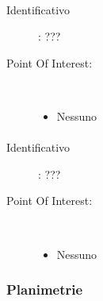 \documentclass[../SperimentazioniPratiche.tex]{subfiles}
\begin{document}
			\paragraph*{}
			\label{01006}
			\begin{tcolorbox}[fonttitle=\bfseries, 
								adjusted title={\Large Beacon 01006},
								sharp corners=south,
								colback=white, 
								colframe=white!50!blue!75!black]
								
				\begin{description}
					\item[Identificativo]: ???

					\tcbline					
					
					\item[Point Of Interest:] \ \par
					\begin{itemize}
						\item Nessuno
					\end{itemize}					   				
				\end{description}  				
			\end{tcolorbox}
			
			\paragraph*{}
			\label{01007}
			\begin{tcolorbox}[fonttitle=\bfseries, 
								adjusted title={\Large Beacon 01007},
								sharp corners=south,
								colback=white, 
								colframe=white!50!blue!75!black]
								
				\begin{description}
					\item[Identificativo]: ???

					\tcbline					
					
					\item[Point Of Interest:] \ \par
					\begin{itemize}
						\item Nessuno
					\end{itemize}					   				
				\end{description}  				
			\end{tcolorbox}
			
		
		
		\newpage
		\subsubsection{Planimetrie}
			
\end{document}

